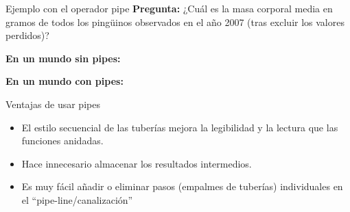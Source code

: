 \documentclass[
  ignorenonframetext,
  aspectratio=169]{beamer}
\newenvironment{Shaded}{\begin{snugshade}}{\end{snugshade}}
\newcommand{\AttributeTok}[1]{\textcolor[rgb]{0.77,0.63,0.00}{#1}}
\newcommand{\CommentTok}[1]{\textcolor[rgb]{0.56,0.35,0.01}{\textit{#1}}}
\newcommand{\DecValTok}[1]{\textcolor[rgb]{0.00,0.00,0.81}{#1}}
\newcommand{\FunctionTok}[1]{\textcolor[rgb]{0.00,0.00,0.00}{#1}}
\newcommand{\NormalTok}[1]{#1}
\newcommand{\OtherTok}[1]{\textcolor[rgb]{0.56,0.35,0.01}{#1}}
\newcommand{\SpecialCharTok}[1]{\textcolor[rgb]{0.00,0.00,0.00}{#1}}
\begin{document}
\begin{frame}[fragile]{Ejemplo con el operador pipe}
\protect\hypertarget{ejemplo-con-el-operador-pipe}{}
\textbf{Pregunta:} ¿Cuál es la masa corporal media en gramos de todos
los pingüinos observados en el año 2007 (tras excluir los valores
perdidos)?

\textbf{En un mundo sin pipes:}

\begin{Shaded}
\end{Shaded}

\textbf{En un mundo con pipes:}

\begin{Shaded}
\end{Shaded}
\end{frame}

\begin{frame}{Ventajas de usar pipes}
\protect\hypertarget{ventajas-de-usar-pipes}{}
\begin{itemize}
\item
  El estilo secuencial de las tuberías mejora la legibilidad y la
  lectura que las funciones anidadas.
\item
  Hace innecesario almacenar los resultados intermedios.
\item
  Es muy fácil añadir o eliminar pasos (empalmes de tuberías)
  individuales en el ``pipe-line/canalización''
\end{itemize}
\end{frame}
\end{document}
